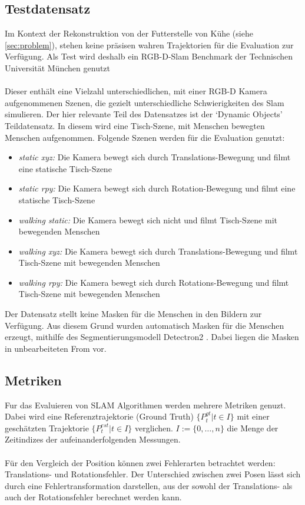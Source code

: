 \documentclass[12pt,DIV=15,BCOR=15mm,twoside,headsepline,abstract=true,listof=totoc,bibliography=totoc]{scrreprt}
\theoremstyle{remark}    %
\begin{document}
    \subsection{Testdatensatz}
    Im Kontext der Rekonstruktion von der Futterstelle von Kühe (siehe \ref{sec:problem}), stehen keine präsisen wahren Trajektorien für 
    die Evaluation zur Verfügung. Als Test wird deshalb ein \ac{RGB-D}-Slam Benchmark der Technischen Universität München genutzt \cite{sturm12iros}\\\\
    Dieser enthält eine Vielzahl unterschiedlichen, mit einer \ac{RGB-D} Kamera aufgenommenen Szenen, die gezielt unterschiedliche Schwierigkeiten
    des Slam simulieren. Der hier relevante Teil des Datensatzes ist der `Dynamic Objects' Teildatensatz. In diesem wird eine Tisch-Szene, mit Menschen
    bewegten Menschen aufgenommen. Folgende Szenen werden für die Evaluation genutzt:
    \begin{itemize}
        \item \emph{static xyz:} Die Kamera bewegt sich durch Translations-Bewegung und filmt eine statische Tisch-Szene
        \item \emph{static rpy:} Die Kamera bewegt sich durch Rotation-Bewegung und filmt eine statische Tisch-Szene
        \item \emph{walking static:} Die Kamera bewegt sich nicht und filmt Tisch-Szene mit bewegenden Menschen
        \item \emph{walking xyz:} Die Kamera bewegt sich durch Translations-Bewegung und filmt Tisch-Szene mit bewegenden Menschen
        \item \emph{walking rpy:} Die Kamera bewegt sich durch Rotations-Bewegung und filmt Tisch-Szene mit bewegenden Menschen
    \end{itemize}
    Der Datensatz stellt keine Masken für die Menschen in den Bildern zur Verfügung. Aus diesem Grund wurden automatisch Masken für die Menschen erzeugt, mithilfe des 
    Segmentierungsmodell Detectron2 \cite{wu2019detectron2}.  Dabei liegen die Masken in unbearbeiteten From vor.

    \subsection{Metriken}
    Fur das Evaluieren von \ac{SLAM} Algorithmen werden mehrere Metriken genuzt. Dabei wird eine Referenztrajektorie (Ground Truth) $\{P^{gt}_t| t \in I\}$ 
    mit einer geschätzten Trajektorie $\{P^{est}_t| t \in I\}$ verglichen. $I:= \{0, \ldots, n\}$ die Menge der Zeitindizes der aufeinanderfolgenden Messungen.\\\\
    Für den Vergleich der Position können zwei Fehlerarten betrachtet werden: Translations- und Rotationsfehler.
    Der Unterschied zwischen zwei Posen lässt sich durch eine Fehlertransformation darstellen, aus der sowohl der Translations- als auch 
    der Rotationsfehler berechnet werden kann.
\end{document}
